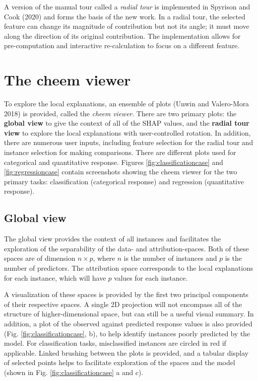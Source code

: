 \documentclass[
]{article}
\begin{document}
A version of the manual tour called a \emph{radial tour} is implemented in Spyrison and Cook (2020) and forms the basis of the new work. In a radial tour, the selected feature can change its magnitude of contribution but not its angle; it must move along the direction of its original contribution. The implementation allows for pre-computation and interactive re-calculation to focus on a different feature.

\hypertarget{sec:cheemviwer}{%
\section{The cheem viewer}\label{sec:cheemviwer}}

To explore the local explanations, an ensemble of plots (Unwin and Valero-Mora 2018) is provided, called the \emph{cheem viewer}. There are two primary plots: the \textbf{global view} to give the context of all of the SHAP values, and the \textbf{radial tour view} to explore the local explanations with user-controlled rotation. In addition, there are numerous user inputs, including feature selection for the radial tour and instance selection for making comparisons. There are different plots used for categorical and quantitative response. Figures \ref{fig:classificationcase} and \ref{fig:regressioncase} contain screenshots showing the cheem viewer for the two primary tasks: classification (categorical response) and regression (quantitative response).

\hypertarget{global-view}{%
\subsection{Global view}\label{global-view}}

The global view provides the context of all instances and facilitates the exploration of the separability of the data- and attribution-spaces. Both of these spaces are of dimension \(n\times p\), where \(n\) is the number of instances and \(p\) is the number of predictors. The attribution space corresponds to the local explanations for each instance, which will have \(p\) values for each instance.

A visualization of these spaces is provided by the first two principal components of their respective spaces. A single 2D projection will not encompass all of the structure of higher-dimensional space, but can still be a useful visual summary. In addition, a plot of the observed against predicted response values is also provided (Fig. \ref{fig:classificationcase}, b), to help identify instances poorly predicted by the model. For classification tasks, misclassified instances are circled in red if applicable. Linked brushing between the plots is provided, and a tabular display of selected points helps to facilitate exploration of the spaces and the model (shown in Fig. \ref{fig:classificationcase} a and c).
\end{document}
